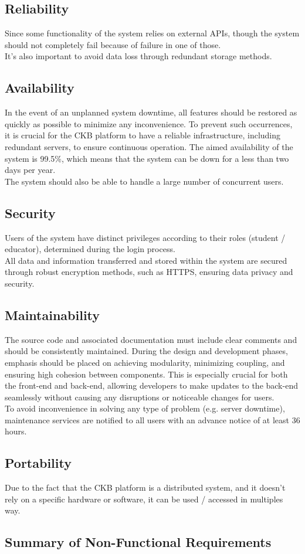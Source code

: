 \subsection{Reliability}
Since some functionality of the system relies on external APIs, though the system should not completely fail because of failure in one of those.\\
It's also important to avoid data loss through redundant storage methods.

\subsection{Availability}
In the event of an unplanned system downtime, all features should be restored as quickly as possible to minimize any inconvenience. To prevent such occurrences, it is crucial for the CKB platform to have a reliable infrastructure, including redundant servers, to ensure continuous operation.
The aimed availability of the system is 99.5\%, which means that the system can be down for a less than two days per year.\\
The system should also be able to handle a large number of concurrent users.

\subsection{Security}
Users of the system have distinct privileges according to their roles (student / educator), determined during the login process.\\
All data and information transferred and stored within the system are secured through robust encryption methods, such as HTTPS, ensuring data privacy and security.\\

\subsection{Maintainability}
The source code and associated documentation must include clear comments and should be consistently maintained. During the design and development phases, emphasis should be placed on achieving modularity, minimizing coupling, and ensuring high cohesion between components.
This is especially crucial for both the front-end and back-end, allowing developers to make updates to the back-end seamlessly without causing any disruptions or noticeable changes for users.\\
To avoid inconvenience in solving any type of problem (e.g. server downtime), maintenance services are notified to all users with an advance notice of at least 36 hours.

\subsection{Portability}
Due to the fact that the CKB platform is a distributed system, and it doesn't rely on a specific hardware or software, it can be used / accessed in multiples way.\\

{\color{red}\subsection*{Summary of Non-Functional Requirements}}
